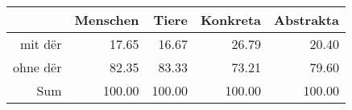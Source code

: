 \begin{tabular}{rrrrr}
  \hline
 & Menschen & Tiere & Konkreta & Abstrakta \\ 
  \hline
mit dër & 17.65 & 16.67 & 26.79 & 20.40 \\ 
  ohne dër & 82.35 & 83.33 & 73.21 & 79.60 \\ 
  Sum & 100.00 & 100.00 & 100.00 & 100.00 \\ 
   \hline
\end{tabular}
